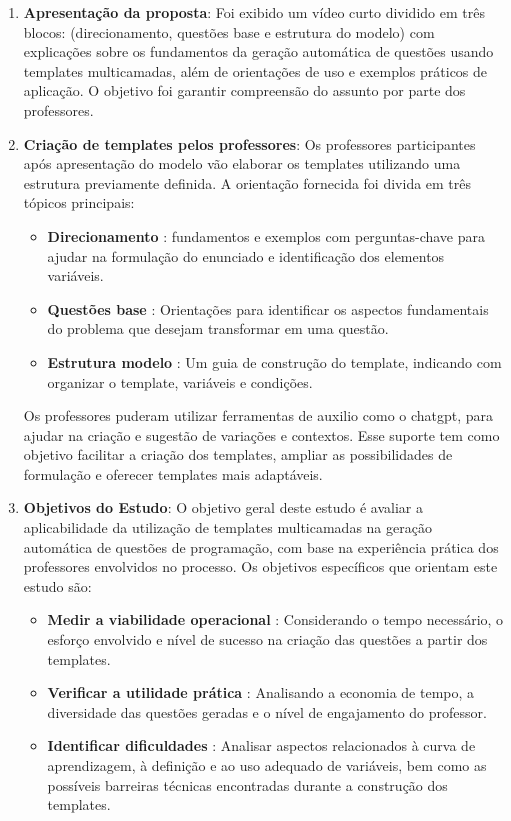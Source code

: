 \begin{enumerate}
    \item \textbf{Apresentação da proposta}:  Foi exibido um vídeo curto dividido em três blocos: (direcionamento, questões base e estrutura do modelo) com explicações sobre os fundamentos da geração automática de questões usando templates multicamadas, além de orientações de uso e exemplos práticos de aplicação. O objetivo foi garantir  compreensão do assunto por parte dos professores.
    
    \item \textbf{Criação de templates pelos professores}:  Os professores participantes após apresentação do modelo vão elaborar os templates utilizando uma estrutura previamente definida. A orientação fornecida foi divida em três tópicos principais:
    \begin{itemize}
        \item \textbf{Direcionamento} : fundamentos e exemplos com perguntas-chave para ajudar na formulação do enunciado e identificação dos elementos variáveis.
        \item \textbf{Questões base} : Orientações para identificar os aspectos fundamentais do problema que desejam transformar em uma questão.
        \item \textbf{Estrutura modelo} : Um guia de construção do template, indicando com organizar o template, variáveis e condições.
    \end{itemize}

Os professores puderam utilizar ferramentas de auxilio como o \gls{chatgpt}, para ajudar na criação e sugestão de variações e contextos. Esse suporte tem como objetivo facilitar a criação dos templates, ampliar as possibilidades de formulação e oferecer templates mais adaptáveis.

    \item \textbf{Objetivos do Estudo}:  O objetivo geral deste estudo é avaliar a aplicabilidade da utilização de templates multicamadas na geração automática de questões de programação, com base na experiência prática dos professores envolvidos no processo. Os objetivos específicos que orientam este estudo são:

       \begin{itemize}
        \item \textbf{Medir a viabilidade operacional} : Considerando o tempo necessário, o esforço envolvido e nível de sucesso na criação das questões a partir dos templates.
        \item \textbf{Verificar a utilidade prática} : Analisando a economia de tempo, a diversidade das questões geradas e o nível de engajamento do professor.
        \item \textbf{Identificar dificuldades} : Analisar aspectos relacionados à curva de aprendizagem, à definição e ao uso adequado de variáveis, bem como as possíveis barreiras técnicas encontradas durante a construção dos templates. 
    \end{itemize}
    

\end{enumerate}
